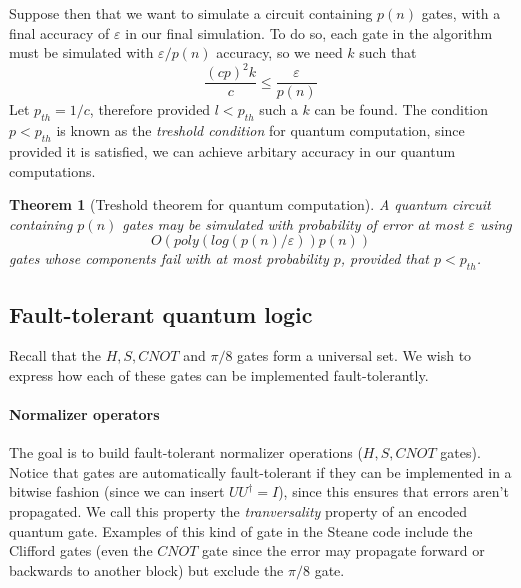 \documentclass[11pt,a4paper]{article}
\theoremstyle{definition}
\theoremstyle{plain}
\newtheorem{theorem}[definition]{Theorem}
\theoremstyle{remark}
\begin{document}
Suppose then that we want to simulate a circuit containing $p(n)$ gates, with a final 
accuracy of $\varepsilon$ in our final simulation. To do so, each gate in the algorithm must 
be simulated with $\varepsilon / p(n)$ accuracy, so we need $k$ such that 
$$\frac{(cp)^2k}{c} \leq \frac{\varepsilon}{p(n)}$$
Let $p_{th} = 1/c$, therefore provided $l < p_{th}$ such a $k$ can be found. The condition $p < p_{th}$ is known as the 
\emph{treshold condition} for quantum computation, since provided it is satisfied, we can achieve arbitary accuracy in our quantum computations. 

\begin{theorem}[Treshold theorem for quantum computation]
  A quantum circuit containing $p(n)$ gates may be simulated with probability of error at most $\varepsilon$ using 
  $$O\left(poly\left(log (p(n) / \varepsilon)\right) p(n)\right)$$
  gates whose components fail with at most probability $p$, provided that $p < p_{th}$. 
\end{theorem}

\subsection{Fault-tolerant quantum logic}
Recall that the $H, S, CNOT$ and $\pi/8$ gates form a universal set. We wish to express how each 
of these gates can be implemented fault-tolerantly. 

\paragraph{Normalizer operators} 
The goal is to build fault-tolerant normalizer operations ($H, S, CNOT$ gates). Notice that gates are automatically fault-tolerant 
if they can be implemented in a bitwise fashion (since we can insert $U U^\dagger = I$), since this ensures that errors aren't propagated. 
We call this property the \emph{tranversality} property of an encoded quantum gate. Examples of this kind of gate in the Steane code 
include the Clifford gates (even the $CNOT$ gate since the error may propagate forward or backwards to another block) but exclude the $\pi / 8$ gate.   
\end{document}

